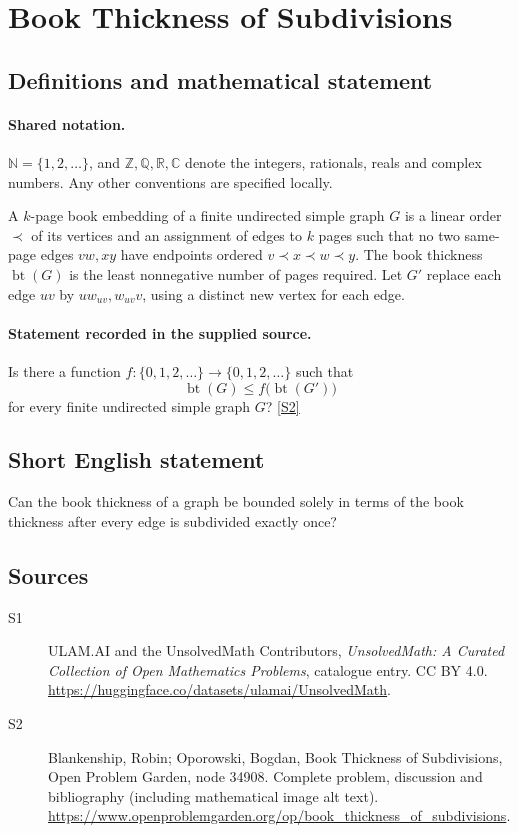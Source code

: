 \documentclass[11pt]{book}
\newcommand{\sref}[2]{\hyperlink{source:#1:#2}{[S#2]}}
\begin{document}
\section{Book Thickness of Subdivisions}\label{statement}

\subsection{Definitions and mathematical statement}

\paragraph{Shared notation.}$\mathbb N=\{1,2,\ldots\}$, and $\mathbb Z,\mathbb Q,\mathbb R,\mathbb C$ denote the integers, rationals, reals and complex numbers. Any other conventions are specified locally.


A $k$-page book embedding of a finite undirected simple graph $G$ is a linear order $\prec$ of its vertices and an assignment of edges to $k$ pages such that no two same-page edges $vw,xy$ have endpoints ordered $v\prec x\prec w\prec y$. The book thickness $\operatorname{bt}(G)$ is the least nonnegative number of pages required. Let $G'$ replace each edge $uv$ by $u w_{uv},w_{uv}v$, using a distinct new vertex for each edge.
\paragraph{Statement recorded in the supplied source.}
Is there a function $f:\{0,1,2,\ldots\}\to\{0,1,2,\ldots\}$ such that
\[\operatorname{bt}(G)\leq f\bigl(\operatorname{bt}(G')\bigr)\]
for every finite undirected simple graph $G$? \sref{statement}{2}
\subsection{Short English statement}
Can the book thickness of a graph be bounded solely in terms of the book thickness after every edge is subdivided exactly once?
\subsection{Sources}
\begin{description}
\item[\hypertarget{source:statement:1}{S1}] ULAM.AI and the UnsolvedMath Contributors, \emph{UnsolvedMath: A Curated Collection of Open Mathematics Problems}, catalogue entry. CC BY 4.0. \url{https://huggingface.co/datasets/ulamai/UnsolvedMath}.
\item[\hypertarget{source:statement:2}{S2}] Blankenship, Robin; Oporowski, Bogdan, Book Thickness of Subdivisions, Open Problem Garden, node 34908. Complete problem, discussion and bibliography (including mathematical image alt text). \url{https://www.openproblemgarden.org/op/book_thickness_of_subdivisions}.
\end{description}
\label{end:statement}
\end{document}
